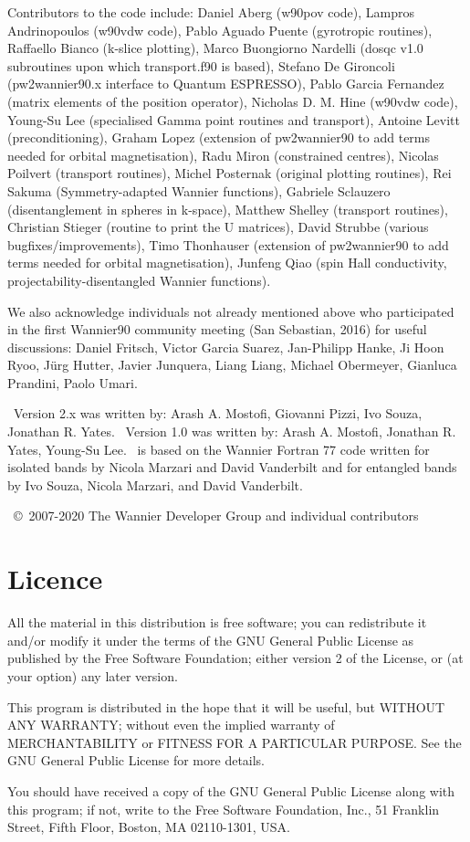 Contributors to the code include:
Daniel Aberg (w90pov code), 
Lampros Andrinopoulos (w90vdw code),
Pablo Aguado Puente (gyrotropic routines),
Raffaello Bianco (k-slice plotting),
Marco Buongiorno Nardelli (dosqc v1.0 subroutines upon which transport.f90 is based),
Stefano De Gironcoli (pw2wannier90.x interface to Quantum ESPRESSO),
Pablo Garcia Fernandez (matrix elements of the position operator),
Nicholas D. M. Hine (w90vdw code),
Young-Su Lee (specialised Gamma point routines and transport),
Antoine Levitt (preconditioning),
Graham Lopez (extension of pw2wannier90 to add terms needed for orbital magnetisation),
Radu Miron (constrained centres),
Nicolas Poilvert (transport routines),
Michel Posternak (original plotting routines),
Rei Sakuma (Symmetry-adapted Wannier functions),
Gabriele Sclauzero (disentanglement in spheres in k-space),
Matthew Shelley (transport routines),
Christian Stieger (routine to print the U matrices),
David Strubbe (various bugfixes/improvements),
Timo Thonhauser (extension of pw2wannier90 to add terms needed for orbital magnetisation),
Junfeng Qiao (spin Hall conductivity, projectability-disentangled Wannier functions).

We also acknowledge individuals not already mentioned above who participated in the first Wannier90 community meeting (San Sebastian, 2016) for useful discussions:
Daniel Fritsch,
Victor Garcia Suarez,
Jan-Philipp Hanke,
Ji Hoon Ryoo,
J\"urg Hutter,
Javier Junquera,
Liang Liang,
Michael Obermeyer,
Gianluca Prandini,
Paolo Umari.

\wannier\ Version 2.x was written by:
Arash A. Mostofi, Giovanni Pizzi, Ivo Souza, Jonathan R. Yates.
\wannier\ Version 1.0 was written by:
Arash A. Mostofi, Jonathan R. Yates, Young-Su Lee.
\wannier\ is based on the Wannier Fortran 77 code written for isolated bands by Nicola Marzari
and David Vanderbilt and for entangled bands by Ivo Souza, Nicola Marzari,
and David Vanderbilt.

\wannier\ \copyright\ 2007-2020 The Wannier Developer Group and individual contributors

\section*{Licence}
All the material in this distribution is free software; you can
redistribute it and/or 
modify it under the terms of the GNU General Public License
as published by the Free Software Foundation; either version 2
of the License, or (at your option) any later version.

This program is distributed in the hope that it will be useful,
but WITHOUT ANY WARRANTY; without even the implied warranty of
MERCHANTABILITY or FITNESS FOR A PARTICULAR PURPOSE.  See the
GNU General Public License for more details.

You should have received a copy of the GNU General Public License
along with this program; if not, write to the Free Software
Foundation, Inc., 51 Franklin Street, Fifth Floor, Boston, MA  02110-1301, USA.


 
